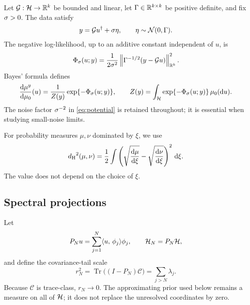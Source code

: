 Let $\mathcal{G}:\mathcal{H}\to\mathbb{R}^k$ be bounded and linear, let
$\Gamma\in\mathbb{R}^{k\times k}$ be positive definite, and fix
$\sigma>0$.  The data satisfy
\begin{equation}
  y=\mathcal{G}{u^{\dagger}}+\sigma\eta,\qquad
  \eta\sim\mathcal N(0,\Gamma).
  \label{eq:forward}
\end{equation}
The negative log-likelihood, up to an additive constant independent of
$u$, is
\begin{equation}
  \Phi_{\sigma}(u;y)
  =\frac{1}{2\sigma^2}
    \left\lVert\Gamma^{-1/2}(y-\mathcal{G} u)\right\rVert_{\mathbb{R}^k}^2 .
  \label{eq:potential}
\end{equation}
Bayes' formula defines
\begin{equation}
  \frac{\mathrm d{\mu^{y}}}{\mathrm d{\mu_{0}}}(u)
  =\frac{1}{Z(y)}
     \exp\{-\Phi_{\sigma}(u;y)\},\qquad
  Z(y)=\int_{\mathcal{H}}\exp\{-\Phi_{\sigma}(u;y)\}\,{\mu_{0}}(\mathrm du).
  \label{eq:posterior}
\end{equation}
The noise factor $\sigma^{-2}$ in \eqref{eq:potential} is retained
throughout; it is essential when studying small-noise limits.

For probability measures $\mu,\nu$ dominated by $\xi$, we use
\begin{equation}
  {d_{\mathrm{H}}}^2(\mu,\nu)
  =\frac12\int
    \left(
      \sqrt{\frac{\mathrm d\mu}{\mathrm d\xi}}
      -\sqrt{\frac{\mathrm d\nu}{\mathrm d\xi}}
    \right)^2\,\mathrm d\xi .
  \label{eq:hellinger}
\end{equation}
The value does not depend on the choice of $\xi$.

\subsection{Spectral projections}

Let
\[
  P_Nu=\sum_{j=1}^N\langle u,\,\phi_j\rangle\phi_j,\qquad
  \mathcal{H}_N=P_N\mathcal{H},
\]
and define the covariance-tail scale
\begin{equation}
  r_N^2
  =\operatorname{Tr}\bigl((I-P_N)\mathcal C\bigr)
  =\sum_{j>N}\lambda_j .
  \label{eq:tail-scale}
\end{equation}
Because $\mathcal C$ is trace-class, $r_N\to0$.  The approximating
prior used below remains a measure on all of $\mathcal{H}$; it does not replace
the unresolved coordinates by zero.
